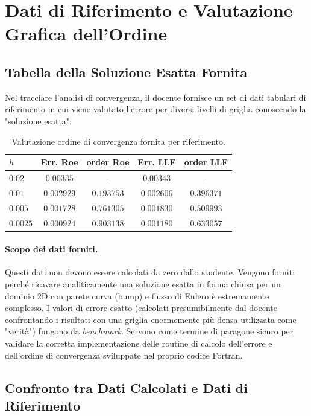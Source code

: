 \section{Dati di Riferimento e Valutazione Grafica dell'Ordine}

\subsection{Tabella della Soluzione Esatta Fornita}
Nel tracciare l'analisi di convergenza, il docente fornisce un set di dati tabulari di riferimento in cui viene valutato l'errore per diversi livelli di griglia conoscendo la "soluzione esatta":

\begin{table}[H]
  \centering
  \caption{Valutazione ordine di convergenza fornita per riferimento.}
  \label{tab:rif_esatta}
  \begin{tabular}{lcccc}
    \toprule
    $h$ & Err. Roe & order Roe & Err. LLF & order LLF \\
    \midrule
    $0.02$   & $0.00335$  & -          & $0.00343$  & - \\
    $0.01$   & $0.002929$ & $0.193753$ & $0.002606$ & $0.396371$ \\
    $0.005$  & $0.001728$ & $0.761305$ & $0.001830$ & $0.509993$ \\
    $0.0025$ & $0.000924$ & $0.903138$ & $0.001180$ & $0.633057$ \\
    \bottomrule
  \end{tabular}
\end{table}

\paragraph{Scopo dei dati forniti.}
Questi dati non devono essere calcolati da zero dallo studente. Vengono forniti perché ricavare analiticamente una soluzione esatta in forma chiusa per un dominio 2D con parete curva (bump) e flusso di Eulero è estremamente complesso. I valori di errore esatto (calcolati presumibilmente dal docente confrontando i risultati con una griglia enormemente più densa utilizzata come "verità") fungono da \textit{benchmark}. Servono come termine di paragone sicuro per validare la corretta implementazione delle routine di calcolo dell'errore e dell'ordine di convergenza sviluppate nel proprio codice Fortran.

\subsection{Confronto tra Dati Calcolati e Dati di Riferimento}
\label{sec:bump_confronto_rif}

